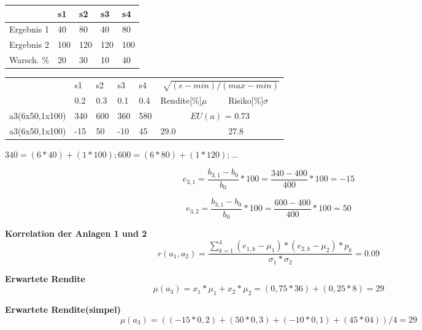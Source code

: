 \documentclass[11pt,twocolumn,fleqn]{article}
\begin{document}
\begin{center}
    \begin{tabular}{ l| l | l | l | l }
           & s1  & s2  & s3  & s4  \\ \hline
Ergebnis 1 & 40  & 80  & 40  & 80  \\
Ergebnis 2 & 100 & 120 & 120 & 100 \\ \hline
Warsch. \% & 20  & 30  & 10  & 40
    \end{tabular}
\end{center}

\begin{center}
    \begin{tabular}{ l | l | l | l | l | l l}
                   & s1  & s2  & s3  & s4 & \multicolumn{2}{c}{$ \sqrt[]{(e-min)/(max-min)} $}  \\
                   & 0.2 & 0.3 & 0.1 & 0.4 & Rendite[\%]$\mu$ & Risiko[\%]$\sigma$ \\ \hline
    a3(6x50,1x100) & 340 & 600 & 360 & 580 & \multicolumn{2}{c}{$EU(a)$ = 0.73} \\ \hline                   
    a3(6x50,1x100) & -15 & 50 & -10 & 45 & 29.0  & 27.8 \\ \hline
    \end{tabular}
\end{center}
$ 340 = (6*40)+(1*100); 600 = (6*80)+(1*120); ...  $

\begin{equation*}
e_{3,1} = \frac{b_{3,1}-b_0} {b_0}* 100 = \frac{340-400}{400}*100=-15
\end{equation*}

\begin{equation*}
e_{3,2} = \frac{b_{3,1}-b_0} {b_0}* 100 = \frac{600-400}{400}*100=50
\end{equation*}

\textbf{Korrelation der Anlagen 1 und 2}
\begin{equation*}
r(a_1,a_2)=\frac{ \sum^4_{k=1}(e_{1,k}-\mu_1)*(e_{2,k}-\mu_2)*p_k }{ \sigma_1 * \sigma_2 } = 0.09
\end{equation*}

\textbf{Erwartete Rendite}
\begin{equation*}
\mu(a_3) = x_1 * \mu_1 + x_2 * \mu_2 = (0,75*36)+(0,25*8)=29
\end{equation*}

\textbf{Erwartete Rendite(simpel)}
\begin{equation*}
\mu(a_3) = ((-15 * 0,2) + (50 * 0,3) + (-10 * 0,1) + (45 * 04)) / 4 = 29 
\end{equation*}
\end{document}

